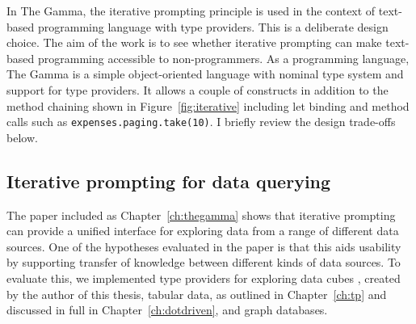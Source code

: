 \documentclass[fleqn,11pt]{report}
\theoremstyle{definition}
\begin{document}
In The Gamma, the iterative prompting principle is used in the context of text-based
programming language with type providers. This is a deliberate design choice. The aim of the
work is to see whether iterative prompting can make text-based programming accessible to
non-programmers. As a programming language, The Gamma is a simple object-oriented language
with nominal type system and support for type providers. It allows a couple of constructs
in addition to the method chaining shown in Figure~\ref{fig:iterative} including let binding
and method calls such as \texttt{expenses.paging.take(10)}. I briefly review the design trade-offs
below.

\subsection{Iterative prompting for data querying}

The paper included as Chapter~\ref{ch:thegamma} shows that iterative prompting can
provide a unified interface for exploring data from a range of different data sources.
One of the hypotheses evaluated in the paper is that this aids usability by supporting transfer
of knowledge between different kinds of data sources. To evaluate this, we implemented
type providers for exploring data cubes \citep{syme-2013-inforich}, created by the author of
this thesis, tabular data, as outlined in Chapter~\ref{ch:tp} and discussed in
full in Chapter~\ref{ch:dotdriven}, and graph databases.
\end{document}
